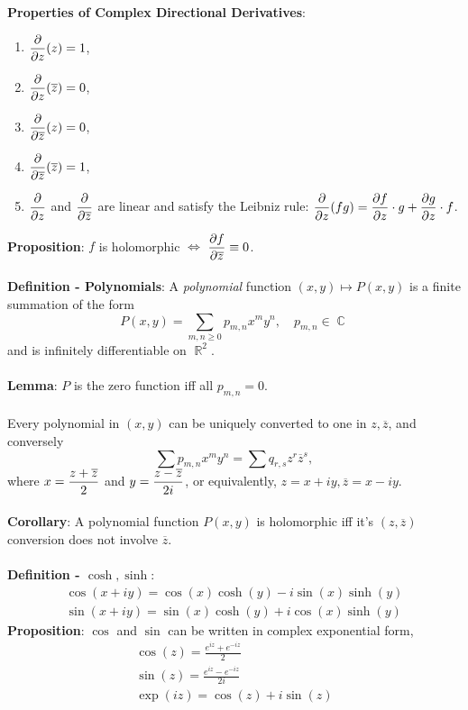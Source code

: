 \documentclass{article}
\DeclareMathOperator{\R}{\mathbb{R}}
\DeclareMathOperator{\C}{\mathbb{C}}
\begin{document}
\textbf{Properties of Complex Directional Derivatives}: \begin{enumerate}
    \item $\mathlarger{\frac{\partial}{\partial z}}(z) = 1$,
    \item $\mathlarger{\frac{\partial}{\partial z}}(\overline{z}) = 0$,
    \item $\mathlarger{\frac{\partial}{\partial \overline{z}}}(z) = 0$,
    \item $\mathlarger{\frac{\partial}{\partial \overline{z}}}(\overline{z}) = 1$,
    \item $\mathlarger{\frac{\partial}{\partial z}}$ and $\mathlarger{\frac{\partial}{\partial \overline{z}}}$ are linear and satisfy the Leibniz rule: $\mathlarger{\frac{\partial}{\partial z}(fg) = \frac{\partial f}{\partial z} \cdot g + \frac{\partial g}{\partial z} \cdot f}$.
\end{enumerate} $ $ \\
\textbf{Proposition}: $f$ is holomorphic $\iff$ $\mathlarger{\frac{\partial f}{\partial \overline{z}}} \equiv 0$. \\ \\
\textbf{Definition - Polynomials}: A \textit{polynomial} function $(x, y) \mapsto P(x, y)$ is a finite summation of the form $$P(x, y) = \sum_{m, n \geq 0} p_{m, n} x^m y^n, \quad p_{m, n} \in \C$$ and is infinitely differentiable on $\R^2$. \\ \\
\textbf{Lemma}: $P$ is the zero function iff all $p_{m, n} = 0$. \\ \\
Every polynomial in $(x, y)$ can be uniquely converted to one in $z, \overline{z}$, and conversely $$\sum p_{m, n}x^m y^n = \sum q_{r, s} z^r \overline{z}^s,$$ where $x = \mathlarger{\frac{z + \overline{z}}{2}}$ and $y = \mathlarger{\frac{z - \overline{z}}{2i}}$, or equivalently, $z = x + iy, \overline{z} = x - iy$. \\ \\
\textbf{Corollary}: A polynomial function $P(x, y)$ is holomorphic iff it's $(z, \overline{z})$ conversion does not involve $\overline{z}.$ \\ \\
\textbf{Definition - $\cosh, \sinh$}: \begin{align*}
    \cos(x + iy) = \cos(x)\cosh(y) - i\sin(x)\sinh(y) \\
    \sin(x + iy) = \sin(x)\cosh(y) + i\cos(x)\sinh(y)
\end{align*}
\textbf{Proposition}: $\cos$ and $\sin$ can be written in complex exponential form, \begin{align*}
    \cos(z) = \frac{e^{iz} + e^{-iz}}{2} \\
    \sin(z) = \frac{e^{iz} - e^{-iz}}{2i} \\
    \exp(iz) = \cos(z) + i \sin(z)
\end{align*} $ $ \\
\end{document}
